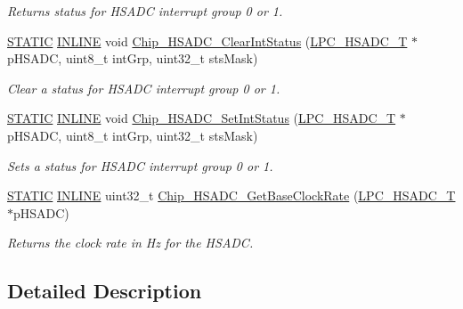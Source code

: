 \begin{DoxyCompactItemize}
\begin{DoxyCompactList}\small\item\em Returns status for H\+S\+A\+DC interrupt group 0 or 1. \end{DoxyCompactList}\item 
\hyperlink{group___l_p_c___types___public___macros_ga10b2d890d871e1489bb02b7e70d9bdfb}{S\+T\+A\+T\+IC} \hyperlink{spifi__18xx__43xx_8h_a2eb6f9e0395b47b8d5e3eeae4fe0c116}{I\+N\+L\+I\+NE} void \hyperlink{group___h_s_a_d_c__18_x_x__43_x_x_gae82a73631a4bfab5393ba6468b4624f0}{Chip\+\_\+\+H\+S\+A\+D\+C\+\_\+\+Clear\+Int\+Status} (\hyperlink{struct_l_p_c___h_s_a_d_c___t}{L\+P\+C\+\_\+\+H\+S\+A\+D\+C\+\_\+T} $\ast$p\+H\+S\+A\+DC, uint8\+\_\+t int\+Grp, uint32\+\_\+t sts\+Mask)
\begin{DoxyCompactList}\small\item\em Clear a status for H\+S\+A\+DC interrupt group 0 or 1. \end{DoxyCompactList}\item 
\hyperlink{group___l_p_c___types___public___macros_ga10b2d890d871e1489bb02b7e70d9bdfb}{S\+T\+A\+T\+IC} \hyperlink{spifi__18xx__43xx_8h_a2eb6f9e0395b47b8d5e3eeae4fe0c116}{I\+N\+L\+I\+NE} void \hyperlink{group___h_s_a_d_c__18_x_x__43_x_x_ga4594b318a86bb5a6532fbba4f8f70b2f}{Chip\+\_\+\+H\+S\+A\+D\+C\+\_\+\+Set\+Int\+Status} (\hyperlink{struct_l_p_c___h_s_a_d_c___t}{L\+P\+C\+\_\+\+H\+S\+A\+D\+C\+\_\+T} $\ast$p\+H\+S\+A\+DC, uint8\+\_\+t int\+Grp, uint32\+\_\+t sts\+Mask)
\begin{DoxyCompactList}\small\item\em Sets a status for H\+S\+A\+DC interrupt group 0 or 1. \end{DoxyCompactList}\item 
\hyperlink{group___l_p_c___types___public___macros_ga10b2d890d871e1489bb02b7e70d9bdfb}{S\+T\+A\+T\+IC} \hyperlink{spifi__18xx__43xx_8h_a2eb6f9e0395b47b8d5e3eeae4fe0c116}{I\+N\+L\+I\+NE} uint32\+\_\+t \hyperlink{group___h_s_a_d_c__18_x_x__43_x_x_gae05840f7109ac514c0a6c696013c0b4c}{Chip\+\_\+\+H\+S\+A\+D\+C\+\_\+\+Get\+Base\+Clock\+Rate} (\hyperlink{struct_l_p_c___h_s_a_d_c___t}{L\+P\+C\+\_\+\+H\+S\+A\+D\+C\+\_\+T} $\ast$p\+H\+S\+A\+DC)
\begin{DoxyCompactList}\small\item\em Returns the clock rate in Hz for the H\+S\+A\+DC. \end{DoxyCompactList}\end{DoxyCompactItemize}


\subsection{Detailed Description}


